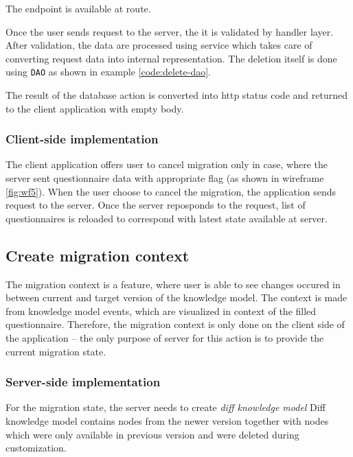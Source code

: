 The endpoint is available at  route.

Once the user sends request to the server, the it is validated by handler layer.
After validation, the data are processed using service which takes care of converting request data into internal representation.
The deletion itself is done using \texttt{DAO} as shown in example \ref{code:delete-dao}.


The result of the database action is converted into \gls{http} status code and returned to the client application with empty body.

\subsubsection*{Client-side implementation}

The client application offers user to cancel migration only in case, where the server sent questionnaire data with appropriate flag (as shown in wireframe \ref{fig:wf5}).
When the user choose to cancel the migration, the application sends request to the server.
Once the server reposponds to the request, list of questionnaires is reloaded to correspond with latest state available at server.

\subsection{Create migration context}\label{sec:create-migration-context}

The migration context is a feature, where user is able to see changes occured in between current and target version of the knowledge model.
The context is made from knowledge model events, which are visualized in context of the filled questionnaire.
Therefore, the migration context is only done on the client side of the application -- the only purpose of server for this action is to provide the current migration state.

\subsubsection*{Server-side implementation}

For the migration state, the server needs to create \textit{diff knowledge model}
Diff knowledge model contains nodes from the newer version together with nodes which were only available in previous version and were deleted during customization.

